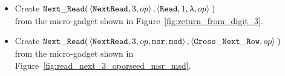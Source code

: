 \begin{itemize}

    \item Create
    $\begin{aligned}[t]
        {\tt Next\_Read}(& \left\langle {\tt NextRead}, 3,          op \right\rangle,
                    \left\langle {\tt Read},     1, \lambda, op \right\rangle \;)
    \end{aligned}$\\from the micro-gadget shown in Figure~\ref{fig:return_from_digit_3}.

    \item Create
    $\begin{aligned}[t]
        {\tt Next\_Read}(& \left\langle {\tt NextRead}, 3, op, {\tt msr}, {\tt msd} \right\rangle,
                    \left\langle {\tt Cross\_Next\_Row}, op \right\rangle \;)
    \end{aligned}$\\from the micro-gadget shown in Figure~\ref{fig:read_next_3_oporseed_msr_msd}.


\end{itemize}